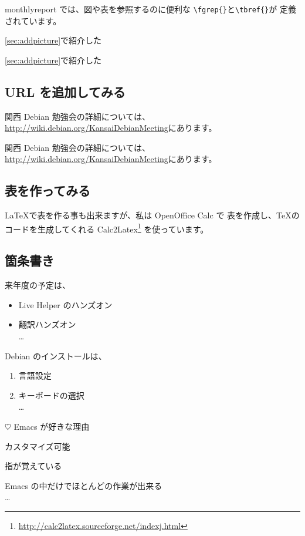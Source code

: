 \documentclass[mingoth,a4paper]{jsarticle}
\begin{document}
monthlyreport では、図や表を参照するのに便利な
\verb|\fgrep{}|と\verb|\tbref{}|が
定義されています。

\ref{sec:addpicture}で紹介した

\begin{commandline}
\ref{sec:addpicture}で紹介した
\end{commandline}

\subsection{URL を追加してみる}

関西 Debian 勉強会の詳細については、\url{http://wiki.debian.org/KansaiDebianMeeting}にあります。

\begin{commandline}
関西 Debian 勉強会の詳細については、\url{http://wiki.debian.org/KansaiDebianMeeting}にあります。
\end{commandline}

\subsection{表を作ってみる}

\LaTeX で表を作る事も出来ますが、私は OpenOffice Calc で
表を作成し、\TeX のコードを生成してくれる
Calc2Latex\footnote{\url{http://calc2latex.sourceforge.net/indexj.html}}
を使っています。

\subsection{箇条書き}

来年度の予定は、
\begin{itemize}
 \item Live Helper のハンズオン
 \item 翻訳ハンズオン\\
\dots{}
\end{itemize}

Debian のインストールは、
\begin{enumerate}
 \item 言語設定
 \item キーボードの選択\\
\dots{}
\end{enumerate}

\begin{list}%
 {$\heartsuit$} %
 {Emacs が好きな理由} %
 \item カスタマイズ可能
 \item 指が覚えている
 \item Emacs の中だけでほとんどの作業が出来る\\
\dots{}
\end{list}
\end{document}
